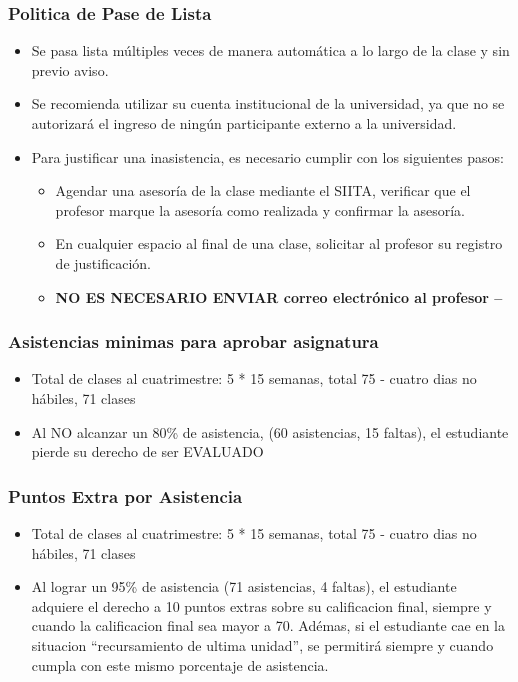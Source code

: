 \documentclass[aspectratio=169]{beamer}
\begin{document}
\begin{frame}
\frametitle{Politica de Pase de Lista}
\begin{itemize}
\item Se pasa lista múltiples veces de manera automática a lo largo de la clase y sin previo aviso.
\item Se recomienda utilizar su cuenta institucional de la universidad, ya que no se autorizará el ingreso de ningún participante externo a la universidad.  
\item Para justificar una inasistencia, es necesario cumplir con los siguientes pasos:
\begin{itemize}	 
\item Agendar una asesoría de la clase mediante el SIITA, verificar que el profesor marque la asesoría como realizada y confirmar la asesoría.
\item En cualquier espacio al final de una clase, solicitar al profesor su registro de justificación.
\item  \textbf{NO ES NECESARIO ENVIAR correo electrónico al profesor -- }
\end{itemize}
\end{itemize}
\end{frame}

\begin{frame}
\frametitle{Asistencias minimas para aprobar asignatura}
\begin{itemize}
\item Total de clases al cuatrimestre: 5 * 15 semanas, total 75 - cuatro dias no hábiles, 71 clases 
\item Al NO alcanzar un 80\% de asistencia, (60 asistencias, 15 faltas), el estudiante pierde su derecho de ser EVALUADO
\end{itemize}


\end{frame}


\begin{frame}
\frametitle{Puntos Extra por Asistencia}
\begin{itemize}
\item Total de clases al cuatrimestre: 5 * 15 semanas, total 75 - cuatro dias no hábiles, 71 clases 
\item Al lograr un 95\% de asistencia (71 asistencias, 4 faltas), el estudiante adquiere el derecho a 10 puntos extras sobre su calificacion final, siempre y cuando la calificacion final sea mayor a 70. Adémas, si el estudiante cae en la situacion ``recursamiento de ultima unidad'', se permitirá siempre y cuando cumpla con este mismo porcentaje de asistencia.
\end{itemize}
\end{frame}
\end{document}
